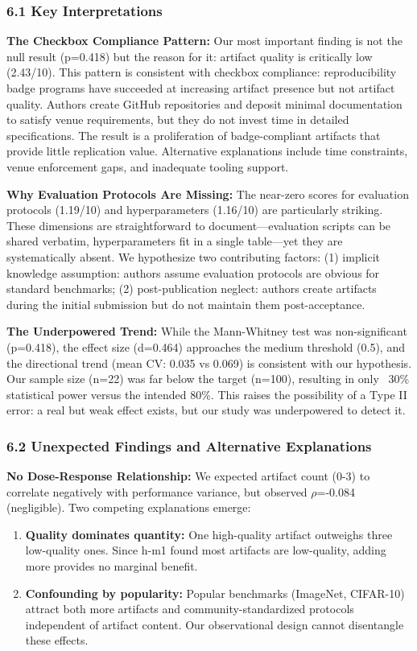 
\subsubsection{6.1 Key Interpretations}

\textbf{The Checkbox Compliance Pattern:} Our most important finding is not the null result (p=0.418) but the reason for it: artifact quality is critically low (2.43/10). This pattern is consistent with checkbox compliance: reproducibility badge programs have succeeded at increasing artifact presence but not artifact quality. Authors create GitHub repositories and deposit minimal documentation to satisfy venue requirements, but they do not invest time in detailed specifications. The result is a proliferation of badge-compliant artifacts that provide little replication value. Alternative explanations include time constraints, venue enforcement gaps, and inadequate tooling support.

\textbf{Why Evaluation Protocols Are Missing:} The near-zero scores for evaluation protocols (1.19/10) and hyperparameters (1.16/10) are particularly striking. These dimensions are straightforward to document---evaluation scripts can be shared verbatim, hyperparameters fit in a single table---yet they are systematically absent. We hypothesize two contributing factors: (1) implicit knowledge assumption: authors assume evaluation protocols are obvious for standard benchmarks; (2) post-publication neglect: authors create artifacts during the initial submission but do not maintain them post-acceptance.

\textbf{The Underpowered Trend:} While the Mann-Whitney test was non-significant (p=0.418), the effect size (d=0.464) approaches the medium threshold (0.5), and the directional trend (mean CV: 0.035 vs 0.069) is consistent with our hypothesis. Our sample size (n=22) was far below the target (n=100), resulting in only ~30\% statistical power versus the intended 80\%. This raises the possibility of a Type II error: a real but weak effect exists, but our study was underpowered to detect it.

\subsubsection{6.2 Unexpected Findings and Alternative Explanations}

\textbf{No Dose-Response Relationship:} We expected artifact count (0-3) to correlate negatively with performance variance, but observed $\rho$=-0.084 (negligible). Two competing explanations emerge:
\begin{enumerate}
\item \textbf{Quality dominates quantity:} One high-quality artifact outweighs three low-quality ones. Since h-m1 found most artifacts are low-quality, adding more provides no marginal benefit.
\item \textbf{Confounding by popularity:} Popular benchmarks (ImageNet, CIFAR-10) attract both more artifacts and community-standardized protocols independent of artifact content. Our observational design cannot disentangle these effects.
\end{enumerate}

